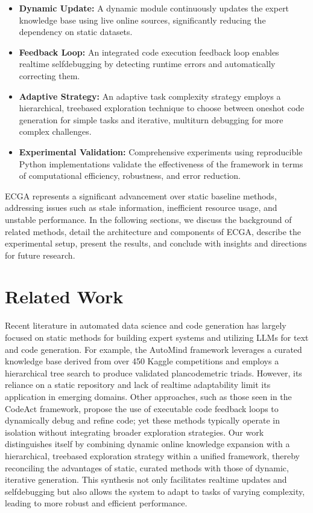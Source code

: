 \documentclass{article} %
\begin{document}
\begin{itemize}
  \item \textbf{Dynamic Update:} A dynamic module continuously updates the expert knowledge base using live online sources, significantly reducing the dependency on static datasets.
  \item \textbf{Feedback Loop:} An integrated code execution feedback loop enables real\-time self\-debugging by detecting runtime errors and automatically correcting them.
  \item \textbf{Adaptive Strategy:} An adaptive task complexity strategy employs a hierarchical, tree\-based exploration technique to choose between one\-shot code generation for simple tasks and iterative, multi\-turn debugging for more complex challenges.
  \item \textbf{Experimental Validation:} Comprehensive experiments using reproducible Python implementations validate the effectiveness of the framework in terms of computational efficiency, robustness, and error reduction.
\end{itemize}

ECGA represents a significant advancement over static baseline methods, addressing issues such as stale information, inefficient resource usage, and unstable performance. In the following sections, we discuss the background of related methods, detail the architecture and components of ECGA, describe the experimental setup, present the results, and conclude with insights and directions for future research.

\section{Related Work}
\label{sec:related}
Recent literature in automated data science and code generation has largely focused on static methods for building expert systems and utilizing LLMs for text and code generation. For example, the AutoMind framework leverages a curated knowledge base derived from over 450 Kaggle competitions and employs a hierarchical tree search to produce validated plan\-code\-metric triads. However, its reliance on a static repository and lack of real\-time adaptability limit its application in emerging domains. Other approaches, such as those seen in the CodeAct framework\citep{Newman2003}, propose the use of executable code feedback loops to dynamically debug and refine code; yet these methods typically operate in isolation without integrating broader exploration strategies. Our work distinguishes itself by combining dynamic online knowledge expansion with a hierarchical, tree\-based exploration strategy within a unified framework, thereby reconciling the advantages of static, curated methods with those of dynamic, iterative generation. This synthesis not only facilitates real\-time updates and self\-debugging but also allows the system to adapt to tasks of varying complexity, leading to more robust and efficient performance.
\end{document}
